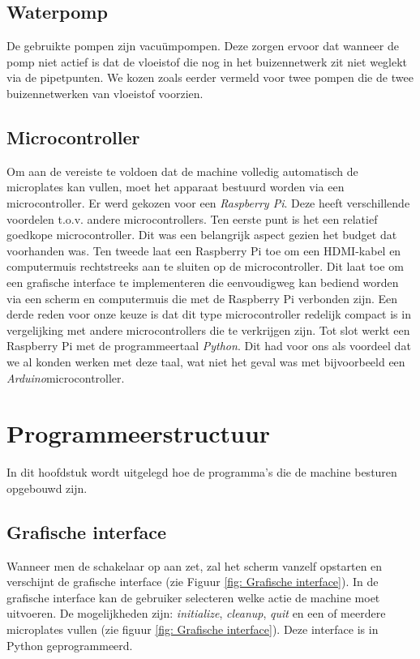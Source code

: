 \documentclass[a4paper,twoside,kulak]{kulakreport} %
\begin{document}
\section{Waterpomp}

De gebruikte pompen zijn vacuümpompen. Deze zorgen ervoor dat wanneer de pomp niet actief is dat de vloeistof die nog in het buizennetwerk zit niet weglekt via de pipetpunten. We kozen zoals eerder vermeld voor twee pompen die de twee buizennetwerken van vloeistof voorzien. 

\section{Microcontroller}

Om aan de vereiste te voldoen dat de machine volledig automatisch de microplates kan vullen, moet het apparaat bestuurd worden via een microcontroller. Er werd gekozen voor een \textit{Raspberry Pi}. Deze heeft verschillende voordelen t.o.v. andere microcontrollers. Ten eerste punt is het een relatief goedkope microcontroller. Dit was een belangrijk aspect gezien het budget dat voorhanden was. Ten tweede laat een Raspberry Pi toe om een HDMI-kabel en computermuis rechtstreeks aan te sluiten op de microcontroller. Dit laat toe om een grafische interface te implementeren die eenvoudigweg kan bediend worden via een scherm en computermuis die met de Raspberry Pi verbonden zijn. Een derde reden voor onze keuze is dat dit type microcontroller redelijk compact is in vergelijking met andere microcontrollers die te verkrijgen zijn. Tot slot werkt een Raspberry Pi met de programmeertaal \textit{Python}. Dit had voor ons als voordeel dat we al konden werken met deze taal, wat niet het geval was met bijvoorbeeld een \textit{Arduino}microcontroller. 



\chapter{Programmeerstructuur}

In dit hoofdstuk wordt uitgelegd hoe de programma's die de machine besturen opgebouwd zijn.

\section{Grafische interface}
Wanneer men de schakelaar op aan zet, zal het scherm vanzelf opstarten en verschijnt de grafische interface (zie Figuur \ref{fig: Grafische interface}). In de grafische interface kan de gebruiker selecteren welke actie de machine moet uitvoeren. De mogelijkheden zijn: \textit{initialize}, \textit{cleanup}, \textit{quit} en een of meerdere microplates vullen (zie figuur \ref{fig: Grafische interface}). Deze interface is in Python geprogrammeerd. 
\end{document}
